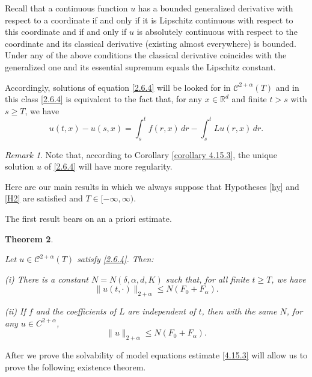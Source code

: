 \documentclass[reqno,12pt]{amsart}
\newtheorem{theorem}{Theorem}[section]
\theoremstyle{definition}
\theoremstyle{remark}
\newtheorem{remark}[theorem]{Remark}
\begin{document}
   Recall that a continuous function  $u$ has a bounded
generalized derivative with respect to a coordinate if and only if
it is Lipschitz continuous with respect to this coordinate and if
and only if $u$ is absolutely continuous with respect to the
coordinate and its classical derivative (existing almost
everywhere) is bounded. Under any of the above conditions the
classical derivative coincides with the generalized one and its
essential supremum equals the Lipschitz constant.

Accordingly,  solutions  of equation \eqref{2.6.4} will be looked
for in ${\mathcal{C}}^{2+\alpha}(T)$ and in this class \eqref{2.6.4} is
equivalent to the fact that, for any $x \in {\mathbb{R}}^d $  and finite
$t>s$ with $s\geq T$, we have
\begin{equation}
                                         \label{2.7.5}
u(t,x)-u(s,x)=\int_{s}^{t}f(r,x)\,dr- \int_{s}^{t}Lu(r,x)\,dr.
\end{equation}

\begin{remark}
Note that,  according to  Corollary \ref{corollary 4.15.3}, the
unique solution $u$ of \eqref{2.6.4} will have  more regularity.
\end{remark}

   Here are
   our  main results in which we always suppose
that Hypotheses \ref{hy} and \ref{H2} are satisfied  and
$T\in[-\infty,\infty)$.

The first result bears on an a priori estimate.

\begin{theorem}
                                       \label{theorem 1.10.1}

Let $u\in{\mathcal{C}}^{2+\alpha} (T)$ satisfy \eqref{2.6.4}. Then:

(i) There is a constant $N=N(\delta,\alpha,d,K)$ such that, for
all finite $t\geq T$, we have
\begin{equation}
                                                       \label{4.15.3}
   \|u(t,\cdot)\|_{2+\alpha} \leq N (F_{0}+F_{\alpha}).
\end{equation}

(ii) If $f$ and the coefficients of $L$ are independent of $t$,
then with the same $N$, for any $u\in C^{2+\alpha} $,
$$
   \|u\|_{2+\alpha}\leq N   ( F_{0}+F_{\alpha}).
$$

\end{theorem}

 
 

After we prove the solvability of model equations estimate
\eqref{4.15.3} will allow us to prove the following existence
theorem.
\end{document}
